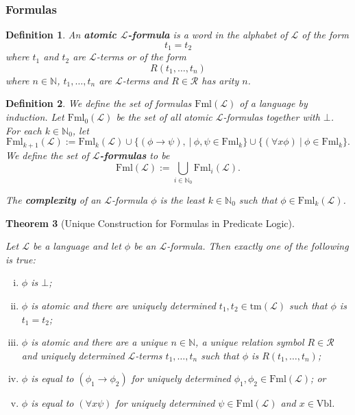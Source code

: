 \documentclass[11pt]{article}
\newcommand{\tm}{\textrm{tm}}
\newcommand{\Fml}{\textrm{Fml}}
\newcommand{\Vbl}{\textrm{Vbl}}
\newtheorem{theorem}{Theorem}[section]
\newtheorem{definition}[theorem]{Definition}
\newcommand{\mcal}[1]{\mathcal{#1}}
\newcommand{\N}{\mathbb{N}}
\newcommand{\st}{\ \vert \ }
\begin{document}
\subsubsection*{Formulas}

\begin{definition}
An \textbf{atomic $\mcal{L}$-formula} is a word in the alphabet of $\mcal{L}$ of the form
\[t_1=t_2\] where $t_1$ and $t_2$ are $\mcal{L}$-terms or of the form
\[R(t_1,\ldots,t_n)\] where $n\in\N$, $t_1,\ldots,t_n$ are $\mcal{L}$-terms and $R\in\mcal{R}$ has arity $n$.
\end{definition}

\begin{definition}
We define the set of formulas $\Fml(\mcal{L})$ of a language by induction. Let $\Fml_0(\mcal{L})$ be the set of all atomic $\mcal{L}$-formulas together with $\bot$. For each $k\in\N_0$, let
\[\Fml_{k+1}(\mcal{L}):=\Fml_k(\mcal{L})\cup\{(\phi\rightarrow \psi),  \st \phi,\psi\in \Fml_k\}\cup\{ (\forall x \phi) \st \phi\in \Fml_k\}.\]
We define the set of \textbf{$\mcal{L}$-formulas} to be
\[\Fml(\mcal{L}):=\bigcup_{i\in\N_0}\Fml_i(\mcal{L}).\]


The \textbf{complexity }of an $\mcal{L}$-formula $\phi$ is the least $k\in\N_0$ such that $\phi\in \Fml_k(\mcal{L})$.
\end{definition}

\begin{theorem}[Unique Construction for Formulas in Predicate Logic]
\

\noindent
Let $\mcal{L}$ be a language and let $\phi $ be an $\mcal{L}$-formula. Then exactly one of the following is true:
\begin{enumerate}[(i)]
\item $\phi$ is $\bot$;
\item $\phi $ is atomic and there are uniquely determined $t_1,t_2\in \tm(\mcal{L})$
such that $\phi $ is $t_1 = t_2$;
\item $\phi $ is atomic and there are a unique $n\in \N $, a unique relation symbol $R\in \mcal{R}$
and uniquely determined $\mcal{L}$-terms $t_1,\ldots,t_n$ such that $\phi $ is
$ R (t_1 ,\ldots,t_n)$;
\item $\phi $ is equal to $(\phi _1\rightarrow \phi _2)$
for uniquely determined $\phi _1,\phi _2\in \Fml(\mcal{L}) $; or
\item $\phi $ is equal to $(\forall x \psi )$
for uniquely determined $\psi \in \Fml(\mcal{L}) $ and $x\in \Vbl $.
\end{enumerate}
\end{theorem}
\end{document}
